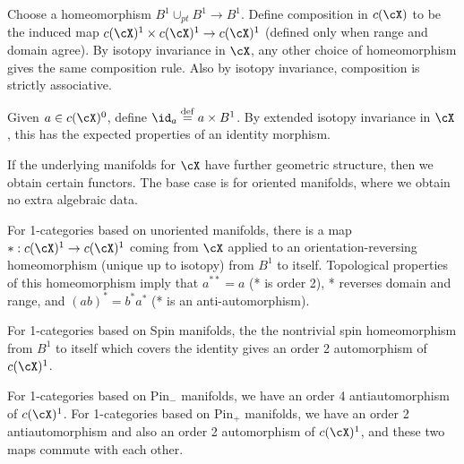 Choose a homeomorphism $B^1\cup_{pt}B^1 \to B^1$.
Define composition in $c(\cX)$ to be the induced map $c(\cX)^1\times c(\cX)^1 \to c(\cX)^1$ 
(defined only when range and domain agree).
By isotopy invariance in $\cX$, any other choice of homeomorphism gives the same composition rule.
Also by isotopy invariance, composition is strictly associative.

Given $a\in c(\cX)^0$, define $\id_a \deq a\times B^1$.
By extended isotopy invariance in $\cX$, this has the expected properties of an identity morphism.


If the underlying manifolds for $\cX$ have further geometric structure, then we obtain certain functors.
The base case is for oriented manifolds, where we obtain no extra algebraic data.

For 1-categories based on unoriented manifolds, 
there is a map $*:c(\cX)^1\to c(\cX)^1$
coming from $\cX$ applied to an orientation-reversing homeomorphism (unique up to isotopy) 
from $B^1$ to itself.
Topological properties of this homeomorphism imply that 
$a^{**} = a$ (* is order 2), * reverses domain and range, and $(ab)^* = b^*a^*$
(* is an anti-automorphism).

For 1-categories based on Spin manifolds,
the the nontrivial spin homeomorphism from $B^1$ to itself which covers the identity
gives an order 2 automorphism of $c(\cX)^1$.

For 1-categories based on $\text{Pin}_-$ manifolds,
we have an order 4 antiautomorphism of $c(\cX)^1$.
For 1-categories based on $\text{Pin}_+$ manifolds,
we have an order 2 antiautomorphism and also an order 2 automorphism of $c(\cX)^1$,
and these two maps commute with each other.


